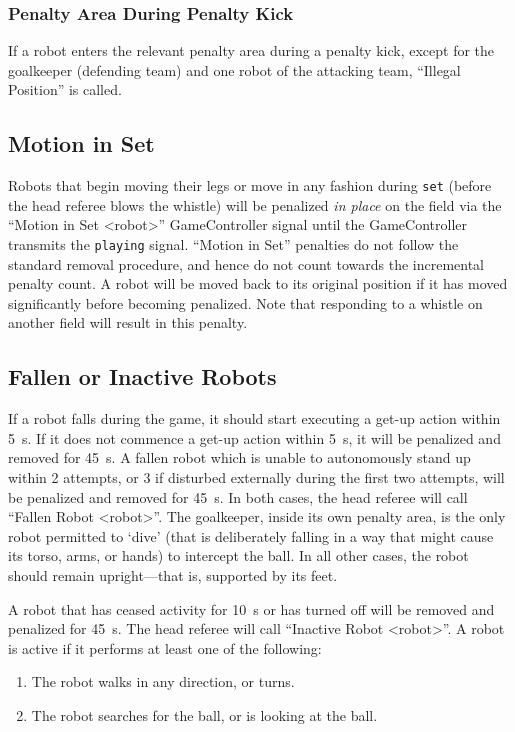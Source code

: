 \subsubsection{Penalty Area During Penalty Kick}
\label{sec:ip_penalty_kick}

If a robot enters the relevant penalty area during a penalty kick, except for the goalkeeper (defending team) and one robot of the attacking team, ``Illegal Position'' is called.

\subsection{Motion in Set}
\label{sec:motion_in_set}

Robots that begin moving their legs or move in any fashion during \texttt{set} (\ie before the head referee blows the whistle) will be penalized \textit{in place} on the field via the ``Motion in Set \textless robot\textgreater'' GameController signal until the GameController transmits the \texttt{playing} signal.
``Motion in Set'' penalties do not follow the standard removal procedure, and hence do not count towards the incremental penalty count.
A robot will be moved back to its original position if it has moved significantly before becoming penalized.
Note that responding to a whistle on another field will result in this penalty.

\subsection{Fallen or Inactive Robots}
\label{sec:fallenrobots}

If a robot falls during the game, it should start executing a get-up action within \qty{5}{\second}.
If it does not commence a get-up action within \qty{5}{\second}, it will be penalized and removed for \qty{45}{\second}.
A fallen robot which is unable to autonomously stand up within 2 attempts, or 3 if disturbed externally during the first two attempts, will be penalized and removed for \qty{45}{\second}.
In both cases, the head referee will call ``Fallen Robot  \textless robot\textgreater''.
The goalkeeper, inside its own penalty area, is the only robot permitted to `dive' (that is deliberately falling in a way that might cause its torso, arms, or hands) to intercept the ball. In all other cases, the robot should remain upright---that is, supported by its feet.

A robot that has ceased activity for \qty{10}{\second} or has turned off will be removed and penalized for \qty{45}{\second}.
The head referee will call ``Inactive Robot  \textless robot\textgreater''.
A robot is active if it performs at least one of the following:
\begin{enumerate}
  \item The robot walks in any direction, or turns.
  \item The robot searches for the ball, or is looking at the ball.
\end{enumerate}

